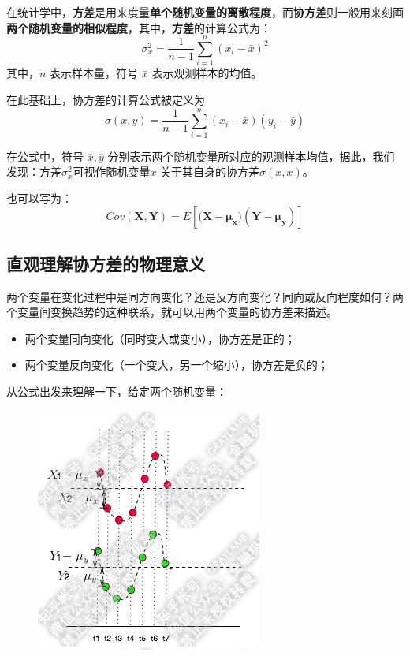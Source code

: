 \documentclass[12pt]{article}
\begin{document}
\begin{mdframed}[
linecolor=black!40,
outerlinewidth=1pt,
roundcorner=.5em,
innertopmargin=1ex,
innerbottommargin=.5\baselineskip,
innerrightmargin=1em,
innerleftmargin=1em,
backgroundcolor=gray!5,
]
在统计学中，\textbf{方差}是用来度量\textbf{单个随机变量的离散程度}，而\textbf{协方差}则一般用来刻画\textbf{两个随机变量的相似程度}，其中，\textbf{方差}的计算公式为：
$$
\sigma_x^2 = \frac{1}{n-1}\sum_{i=1}^n(x_i - \bar{x})^2
$$
其中，$n$ 表示样本量，符号 $\bar{x}$ 表示观测样本的均值。
\end{mdframed}

在此基础上，协方差的计算公式被定义为
$$
\sigma(x,y) = \frac{1}{n-1}\sum_{i=1}^n(x_i - \bar{x})(y_i - \bar{y})
$$

在公式中，符号 $\bar{x},\bar{y}$ 分别表示两个随机变量所对应的观测样本均值，据此，我们发现：方差$\sigma_x^2$可视作随机变量$x$ 关于其自身的协方差$\sigma(x,x)$。

也可以写为：
$$
Cov(\mathbf{X},\mathbf{Y}) = E[(\mathbf{X - \mu_x)(\mathbf{Y} - \mu_y)}]
$$

\subsection{直观理解协方差的物理意义}
两个变量在变化过程中是同方向变化？还是反方向变化？同向或反向程度如何？两个变量间变换趋势的这种联系，就可以用两个变量的协方差来描述。
\begin{itemize}
\setlength{\itemsep}{0pt}
\setlength{\parsep}{0pt}
\setlength{\parskip}{0pt}
    \item 两个变量同向变化（同时变大或变小），协方差是正的；
    \item 两个变量反向变化（一个变大，另一个缩小），协方差是负的；
\end{itemize}

从公式出发来理解一下，给定两个随机变量：
\begin{figure}[H]
    \centering
    \includegraphics[width=.5\textwidth]{fig/UnderstandCovarianceMatrix_1.jpg}
\end{figure} 
\end{document}
